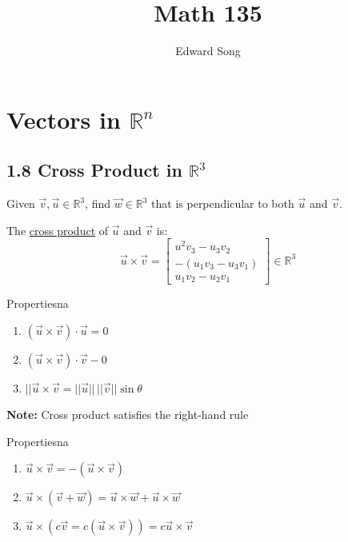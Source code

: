 \documentclass[11pt]{article}
\title{Math 135}
\author{Edward Song}
\theoremstyle{plain}
\theoremstyle{remark}
\theoremstyle{plain}
\newcommand{\bd}{\textbf}
\newcommand{\rn}{\mathbb{R}}
\begin{document}
\section{Vectors in $\rn^n$}


   


\subsection*{1.8 Cross Product in $\rn^3$}
\begin{tcolorbox}[colback=magenta!5!white,colframe=magenta!75!black,title=Example]
   Given $\overrightarrow{v}, \overrightarrow{u}\in\rn^3$, find $\overrightarrow{w}\in\rn^3$ that is
   perpendicular to both $\overrightarrow{u}$ and $\overrightarrow{v}$.
\end{tcolorbox}   

\begin{tcolorbox}[colback=green!5!white,colframe=green!75!black,title=Definition]
    The \underline{cross product} of $\overrightarrow{u}$ and $\overrightarrow{v}$ is:
    \[\overrightarrow{u}\times\overrightarrow{v} = \begin{bmatrix}
        u^2v_3-u_3v_2 \\
        - (u_1v_3-u_3v_1) \\
        u_1v_2-u_2v_1
    \end{bmatrix} \in \rn^3\]
 \end{tcolorbox}   

 \begin{theo}{Properties}{na}
    \begin{enumerate}
        \item $(\overrightarrow{u}\times\overrightarrow{v})\cdot\overrightarrow{u} = 0$ 
        \item $(\overrightarrow{u}\times\overrightarrow{v})\cdot\overrightarrow{v} - 0$
        \item $||\overrightarrow{u}\times\overrightarrow{v} = ||\overrightarrow{u}||\,||\overrightarrow{v}||\sin\theta$
    \end{enumerate}
 \end{theo}

 \bd{Note:} Cross product satisfies the right-hand rule

 \begin{theo}{Properties}{na}
    \begin{enumerate}
        \item $\overrightarrow{u}\times\overrightarrow{v} = -(\overrightarrow{u}\times\overrightarrow{v})$
        \item $\overrightarrow{u}\times(\overrightarrow{v}+\overrightarrow{w}) = \overrightarrow{u}\times\overrightarrow{w}+\overrightarrow{u}\times\overrightarrow{w}$
        \item $\overrightarrow{u}\times({c\overrightarrow{v}} = c(\overrightarrow{u}\times\overrightarrow{v})) = c\overrightarrow{u} \times \overrightarrow{v}$
    \end{enumerate}
 \end{theo}
\end{document}
